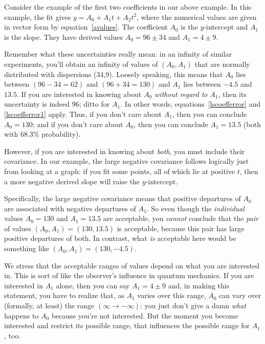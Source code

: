 {{	Consider the example of the first two coefficients in our above
example.  In this example, the fit gives $y = A_0 + A_1 t + A_2 t^2$,
where the numerical values are given in vector form by
equation~\ref{avalues}. The coefficient $A_0$ is the $y$-intercept and
$A_1$ is the slope. They have derived values $A_0 = 96 \pm 34$ and $A_1
= 4 \pm 9$. 

	Remember what these uncertainties really mean: in an infinity of
similar experiments, you'll obtain an infinity of values of $(A_0,A_1)$
that are normally distributed with dispersions (34,9).  Loosely
speaking, this means that $A_0$ lies between $(96-34=62)$ and
$(96+34=130)$ and $A_1$ lies between $-4.5$ and $13.5$.  If you are
interested in knowing about $A_0$ {\it without regard to $A_1$}, then
its uncertainty is indeed 96; ditto for $A_1$.  In other words,
equations~\ref{lscoefferror} and \ref{lscoefferror1} apply.  Thus, if
you don't care about $A_1$, then you can conclude $A_0 = 130$; and if
you don't care about $A_0$, then you can conclude $A_1=13.5$ (both with
$68.3\%$ probability). 

	However, if you are interested in knowing about {\it both}, you
must include their covariance.  In our example, the large negative
covariance follows logically just from looking at a graph: if you fit
some points, all of which lie at positive $t$, then a more negative
derived slope will raise the $y$-intercept. 

	Specifically, the large negative covariance means that positive
departures of $A_0$ are associated with negative departures of $A_1$. 
So even though the {\it individual} values $A_0=130$ and $A_1=13.5$ are
acceptable, you {\it cannot} conclude that the {\it pair} of values
$(A_0,A_1) = (130, 13.5)$ is acceptable, because this pair has large
positive departures of both.  In contrast, what {\it is} acceptable here
would be something like $(A_0,A_1) = (130, -4.5)$. 

	We stress that the acceptable ranges of values depend on what
you are interested in.  This is sort of like the observer's influence in
quantum mechanics.  If you are interested in $A_1$ alone, then you can
say $A_1 = 4 \pm 9$ and, in making this statement, you have to realize
that, as $A_1$ varies over this range, $A_0$ can vary over (formally, at
least) the range $(\infty \rightarrow -\infty)$: you just don't give a
damn {\it what} happens to $A_0$ because you're not interested.  But the
moment you become interested and restrict its possible range, that
influences the possible range for $A_1$, too. 
 
}}
